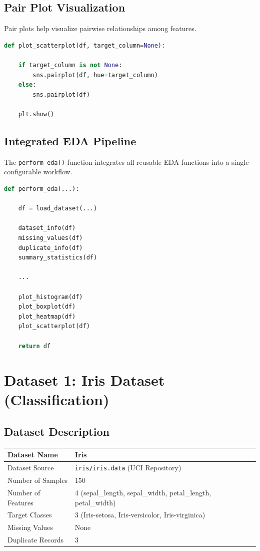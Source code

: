 \documentclass[12pt,a4paper]{article}
\begin{document}
\subsection{Pair Plot Visualization}

Pair plots help visualize pairwise relationships among features.

\begin{lstlisting}[language=Python,caption={Pair Plot}]
def plot_scatterplot(df, target_column=None):

    if target_column is not None:
        sns.pairplot(df, hue=target_column)
    else:
        sns.pairplot(df)

    plt.show()
\end{lstlisting}


\subsection{Integrated EDA Pipeline}

The \texttt{perform\_eda()} function integrates all reusable EDA functions into
a single configurable workflow.

\begin{lstlisting}[language=Python,caption={Integrated EDA Pipeline}]
def perform_eda(...):

    df = load_dataset(...)

    dataset_info(df)
    missing_values(df)
    duplicate_info(df)
    summary_statistics(df)

    ...

    plot_histogram(df)
    plot_boxplot(df)
    plot_heatmap(df)
    plot_scatterplot(df)

    return df
\end{lstlisting}

\section{Dataset 1: Iris Dataset (Classification)}

\subsection{Dataset Description}
\begin{longtable}{|p{5cm}|p{9cm}|}
\hline
Dataset Name & Iris \\ \hline
Dataset Source & \texttt{iris/iris.data} (UCI Repository) \\ \hline
Number of Samples & 150 \\ \hline
Number of Features & 4 (sepal\_length, sepal\_width, petal\_length, petal\_width) \\ \hline
Target Classes & 3 (Iris-setosa, Iris-versicolor, Iris-virginica) \\ \hline
Missing Values & None \\ \hline
Duplicate Records & 3 \\ \hline
\end{longtable}
\end{document}

